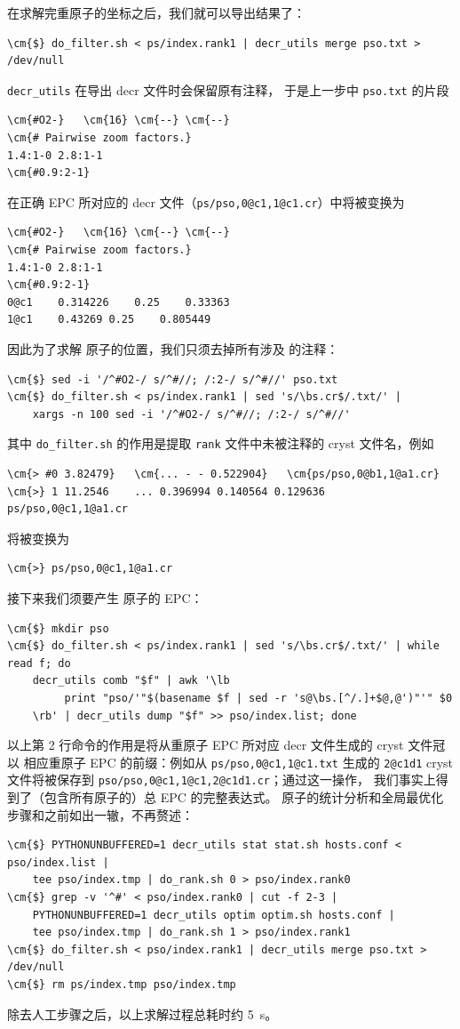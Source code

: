 在求解完重原子的坐标之后，我们就可以导出结果了：
\begin{Verbatim}
\cm{$} do_filter.sh < ps/index.rank1 | decr_utils merge pso.txt > /dev/null
\end{Verbatim}
\verb|decr_utils| 在导出 decr 文件时会保留原有注释，
于是上一步中 \verb|pso.txt| 的片段
\begin{Verbatim}
\cm{#O2-}	\cm{16}	\cm{--}	\cm{--}
\cm{# Pairwise zoom factors.}
1.4:1-0 2.8:1-1
\cm{#0.9:2-1}
\end{Verbatim}
在正确 EPC 所对应的 decr 文件（\verb|ps/pso,0@c1,1@c1.cr|）中将被变换为
\begin{Verbatim}
\cm{#O2-}	\cm{16}	\cm{--}	\cm{--}
\cm{# Pairwise zoom factors.}
1.4:1-0 2.8:1-1
\cm{#0.9:2-1}
0@c1	0.314226	0.25	0.33363
1@c1	0.43269	0.25	0.805449
\end{Verbatim}
因此为了求解  原子的位置，我们只须去掉所有涉及  的注释：
\begin{Verbatim}
\cm{$} sed -i '/^#O2-/ s/^#//; /:2-/ s/^#//' pso.txt
\cm{$} do_filter.sh < ps/index.rank1 | sed 's/\bs.cr$/.txt/' |
	xargs -n 100 sed -i '/^#O2-/ s/^#//; /:2-/ s/^#//'
\end{Verbatim}
其中 \verb|do_filter.sh| 的作用是提取 \verb|rank|
文件中未被注释的 cryst 文件名，例如
\begin{Verbatim}
\cm{> #0 3.82479}	\cm{... - - 0.522904}	\cm{ps/pso,0@b1,1@a1.cr}
\cm{>} 1 11.2546	... 0.396994 0.140564 0.129636	ps/pso,0@c1,1@a1.cr
\end{Verbatim}
将被变换为
\begin{Verbatim}
\cm{>} ps/pso,0@c1,1@a1.cr
\end{Verbatim}

接下来我们须要产生  原子的 EPC：
\begin{Verbatim}
\cm{$} mkdir pso
\cm{$} do_filter.sh < ps/index.rank1 | sed 's/\bs.cr$/.txt/' | while read f; do
	decr_utils comb "$f" | awk '\lb
	     print "pso/'"$(basename $f | sed -r 's@\bs.[^/.]+$@,@')"'" $0
	\rb' | decr_utils dump "$f" >> pso/index.list; done
\end{Verbatim}
以上第 2 行命令的作用是将从重原子 EPC 所对应 decr 文件生成的 cryst 文件冠以
相应重原子 EPC 的前缀：例如从 \verb|ps/pso,0@c1,1@c1.txt| 生成的 \verb|2@c1d1|
cryst 文件将被保存到 \verb|pso/pso,0@c1,1@c1,2@c1d1.cr|；通过这一操作，
我们事实上得到了（包含所有原子的）总 EPC 的完整表达式。
原子的统计分析和全局最优化步骤和之前如出一辙，不再赘述：
\begin{Verbatim}
\cm{$} PYTHONUNBUFFERED=1 decr_utils stat stat.sh hosts.conf < pso/index.list |
	tee pso/index.tmp | do_rank.sh 0 > pso/index.rank0
\cm{$} grep -v '^#' < pso/index.rank0 | cut -f 2-3 |
	PYTHONUNBUFFERED=1 decr_utils optim optim.sh hosts.conf |
	tee pso/index.tmp | do_rank.sh 1 > pso/index.rank1
\cm{$} do_filter.sh < pso/index.rank1 | decr_utils merge pso.txt > /dev/null
\cm{$} rm ps/index.tmp pso/index.tmp
\end{Verbatim}
除去人工步骤之后，以上求解过程总耗时约 \SI{5}{\second}。

